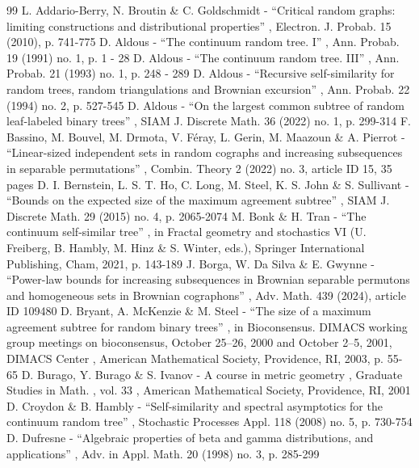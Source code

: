 \begin{thebibliography}{99}
 L. Addario-Berry, N. Broutin \& C. Goldschmidt - “Critical random graphs: limiting constructions and distributional properties” , Electron. J. Probab. 15 (2010), p. 741-775
 D. Aldous - “The continuum random tree. I” , Ann. Probab. 19 (1991) no. 1, p. 1 - 28
 D. Aldous - “The continuum random tree. III” , Ann. Probab. 21 (1993) no. 1, p. 248 - 289
 D. Aldous - “Recursive self-similarity for random trees, random triangulations and Brownian excursion” , Ann. Probab. 22 (1994) no. 2, p. 527-545
 D. Aldous - “On the largest common subtree of random leaf-labeled binary trees” , SIAM J. Discrete Math. 36 (2022) no. 1, p. 299-314
 F. Bassino, M. Bouvel, M. Drmota, V. Féray, L. Gerin, M. Maazoun \& A. Pierrot - “Linear-sized independent sets in random cographs and increasing subsequences in separable permutations” , Combin. Theory 2 (2022) no. 3, article ID 15, 35 pages
 D. I. Bernstein, L. S. T. Ho, C. Long, M. Steel, K. S. John \& S. Sullivant - “Bounds on the expected size of the maximum agreement subtree” , SIAM J. Discrete Math. 29 (2015) no. 4, p. 2065-2074
 M. Bonk \& H. Tran - “The continuum self-similar tree” , in Fractal geometry and stochastics VI (U. Freiberg, B. Hambly, M. Hinz \& S. Winter, eds.), Springer International Publishing, Cham, 2021, p. 143-189
 J. Borga, W. Da Silva \& E. Gwynne - “Power-law bounds for increasing subsequences in Brownian separable permutons and homogeneous sets in Brownian cographons” , Adv. Math. 439 (2024), article ID 109480
 D. Bryant, A. McKenzie \& M. Steel - “The size of a maximum agreement subtree for random binary trees” , in Bioconsensus. DIMACS working group meetings on bioconsensus, October 25–26, 2000 and October 2–5, 2001, DIMACS Center , American Mathematical Society, Providence, RI, 2003, p. 55-65
 D. Burago, Y. Burago \& S. Ivanov - A course in metric geometry , Graduate Studies in Math. , vol. 33 , American Mathematical Society, Providence, RI, 2001
 D. Croydon \& B. Hambly - “Self-similarity and spectral asymptotics for the continuum random tree” , Stochastic Processes Appl. 118 (2008) no. 5, p. 730-754
 D. Dufresne - “Algebraic properties of beta and gamma distributions, and applications” , Adv. in Appl. Math. 20 (1998) no. 3, p. 285-299

\end{thebibliography}
